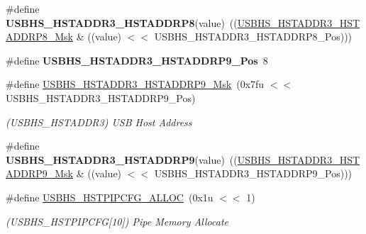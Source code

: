 \begin{DoxyCompactItemize}
\#define {\bfseries U\+S\+B\+H\+S\+\_\+\+H\+S\+T\+A\+D\+D\+R3\+\_\+\+H\+S\+T\+A\+D\+D\+R\+P8}(value)~((\mbox{\hyperlink{group__SAMV71__USBHS_gadea2e5a1320c92fb706cd154af7f626b}{U\+S\+B\+H\+S\+\_\+\+H\+S\+T\+A\+D\+D\+R3\+\_\+\+H\+S\+T\+A\+D\+D\+R\+P8\+\_\+\+Msk}} \& ((value) $<$$<$ U\+S\+B\+H\+S\+\_\+\+H\+S\+T\+A\+D\+D\+R3\+\_\+\+H\+S\+T\+A\+D\+D\+R\+P8\+\_\+\+Pos)))
\item 
\mbox{\label{group__SAMV71__USBHS_ga236b909f99bdb298b43a699a82c9cc2c}} 
\#define {\bfseries U\+S\+B\+H\+S\+\_\+\+H\+S\+T\+A\+D\+D\+R3\+\_\+\+H\+S\+T\+A\+D\+D\+R\+P9\+\_\+\+Pos}~8
\item 
\mbox{\label{group__SAMV71__USBHS_ga7441ecd79e733d277b037d6579a2fe36}} 
\#define \mbox{\hyperlink{group__SAMV71__USBHS_ga7441ecd79e733d277b037d6579a2fe36}{U\+S\+B\+H\+S\+\_\+\+H\+S\+T\+A\+D\+D\+R3\+\_\+\+H\+S\+T\+A\+D\+D\+R\+P9\+\_\+\+Msk}}~(0x7fu $<$$<$ U\+S\+B\+H\+S\+\_\+\+H\+S\+T\+A\+D\+D\+R3\+\_\+\+H\+S\+T\+A\+D\+D\+R\+P9\+\_\+\+Pos)
\begin{DoxyCompactList}\small\item\em (U\+S\+B\+H\+S\+\_\+\+H\+S\+T\+A\+D\+D\+R3) U\+SB Host Address \end{DoxyCompactList}\item 
\mbox{\label{group__SAMV71__USBHS_gad5adc5f70b973439c7dc46a65bfe24a3}} 
\#define {\bfseries U\+S\+B\+H\+S\+\_\+\+H\+S\+T\+A\+D\+D\+R3\+\_\+\+H\+S\+T\+A\+D\+D\+R\+P9}(value)~((\mbox{\hyperlink{group__SAMV71__USBHS_ga7441ecd79e733d277b037d6579a2fe36}{U\+S\+B\+H\+S\+\_\+\+H\+S\+T\+A\+D\+D\+R3\+\_\+\+H\+S\+T\+A\+D\+D\+R\+P9\+\_\+\+Msk}} \& ((value) $<$$<$ U\+S\+B\+H\+S\+\_\+\+H\+S\+T\+A\+D\+D\+R3\+\_\+\+H\+S\+T\+A\+D\+D\+R\+P9\+\_\+\+Pos)))
\item 
\mbox{\label{group__SAMV71__USBHS_ga748a87e1440adf71b43858b99e3cc948}} 
\#define \mbox{\hyperlink{group__SAMV71__USBHS_ga748a87e1440adf71b43858b99e3cc948}{U\+S\+B\+H\+S\+\_\+\+H\+S\+T\+P\+I\+P\+C\+F\+G\+\_\+\+A\+L\+L\+OC}}~(0x1u $<$$<$ 1)
\begin{DoxyCompactList}\small\item\em (U\+S\+B\+H\+S\+\_\+\+H\+S\+T\+P\+I\+P\+C\+FG\mbox{[}10\mbox{]}) Pipe Memory Allocate \end{DoxyCompactList}\item 
\mbox{\label{group__SAMV71__USBHS_gab1f8218fe0338a75c16c89c69cb92356}} 

\end{DoxyCompactItemize}
